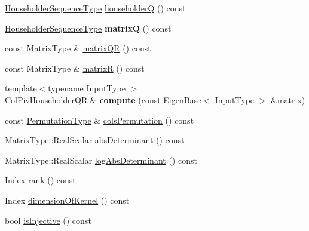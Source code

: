 \begin{DoxyCompactItemize}
\item 
\mbox{\hyperlink{class_eigen_1_1_householder_sequence}{Householder\+Sequence\+Type}} \mbox{\hyperlink{class_eigen_1_1_col_piv_householder_q_r_a28ab9d8916ca609c5469c4c192fbfa28}{householderQ}} () const
\item 
\mbox{\label{class_eigen_1_1_col_piv_householder_q_r_a8d7cb1ac2cbb00a283f59f6d26ae763c}} 
\mbox{\hyperlink{class_eigen_1_1_householder_sequence}{Householder\+Sequence\+Type}} {\bfseries matrixQ} () const
\item 
const Matrix\+Type \& \mbox{\hyperlink{class_eigen_1_1_col_piv_householder_q_r_aa572ac050c8d4fadd4f08a87f6b1e62b}{matrix\+QR}} () const
\item 
const Matrix\+Type \& \mbox{\hyperlink{class_eigen_1_1_col_piv_householder_q_r_a44c534d47bde6b67ce4b5247d142ef30}{matrixR}} () const
\item 
\mbox{\label{class_eigen_1_1_col_piv_householder_q_r_a1cf5d190eae8bdea76a850a5374c4b0c}} 
{\footnotesize template$<$typename Input\+Type $>$ }\\\mbox{\hyperlink{class_eigen_1_1_col_piv_householder_q_r}{Col\+Piv\+Householder\+QR}} \& {\bfseries compute} (const \mbox{\hyperlink{struct_eigen_1_1_eigen_base}{Eigen\+Base}}$<$ Input\+Type $>$ \&matrix)
\item 
const \mbox{\hyperlink{class_eigen_1_1_permutation_matrix}{Permutation\+Type}} \& \mbox{\hyperlink{class_eigen_1_1_col_piv_householder_q_r_ab6ad43e6a6fb75726eae0d5499948f4a}{cols\+Permutation}} () const
\item 
Matrix\+Type\+::\+Real\+Scalar \mbox{\hyperlink{class_eigen_1_1_col_piv_householder_q_r_ac87c3bf42098d6f7324dafbc50fa83f7}{abs\+Determinant}} () const
\item 
Matrix\+Type\+::\+Real\+Scalar \mbox{\hyperlink{class_eigen_1_1_col_piv_householder_q_r_afdc29438a335871f67449c253369ce12}{log\+Abs\+Determinant}} () const
\item 
Index \mbox{\hyperlink{class_eigen_1_1_col_piv_householder_q_r_a2a59aaa689613ce5ef0c9130ad33940e}{rank}} () const
\item 
Index \mbox{\hyperlink{class_eigen_1_1_col_piv_householder_q_r_a7c9294565d179226133770160b827be1}{dimension\+Of\+Kernel}} () const
\item 
bool \mbox{\hyperlink{class_eigen_1_1_col_piv_householder_q_r_a0031998053c9c7345c9458f7443aa263}{is\+Injective}} () const

\end{DoxyCompactItemize}

